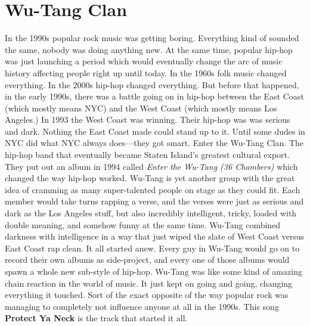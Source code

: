 \documentclass[letterpaper,single]{article}
\begin{document}
\section{Wu-Tang Clan}
In the 1990s popular rock music was getting boring. 
Everything kind of sounded the same, nobody was doing anything new.
At the same time, popular hip-hop was just launching a period which would eventually change the arc of music history affecting people right up until today.
In the 1960s folk music changed everything. In the 2000s hip-hop changed everything.
But before that happened, in the early 1990s, there was a battle going on in hip-hop between the East Coast (which mostly means NYC) and the West Coast (which mostly means Los Angeles.)
In 1993 the West Coast was winning. 
Their hip-hop was was serious and dark.
Nothing the East Coast made could stand up to it.
Until some dudes in NYC did what NYC always does---they got smart.
Enter the Wu-Tang Clan. The hip-hop band that eventually became Staten Island's greatest cultural export.
They put out an album in 1994 called \emph{Enter the Wu-Tang (36 Chambers)} which changed the way hip-hop worked.
Wu-Tang is yet another group with the great idea of cramming as many super-talented people on stage as they could fit.
Each member would take turns rapping a verse, and the verses were just as serious and dark as the Los Angeles stuff, but also incredibly intelligent, tricky, loaded with double meaning, and somehow funny at the same time.
Wu-Tang combined darkness with intelligence in a way that just wiped the slate of West Coast versus East Coast rap clean. It all started anew.
Every guy in Wu-Tang would go on to record their own albums as side-project, and every one of those albums would spawn a whole new sub-style of hip-hop.
Wu-Tang was like some kind of amazing chain reaction in the world of music. It just kept on going and going, changing everything it touched.
Sort of the exact opposite of the way popular rock was managing to completely not influence anyone at all in the 1990s.
This song \textbf{Protect Ya Neck} is the track that started it all.
\end{document}
